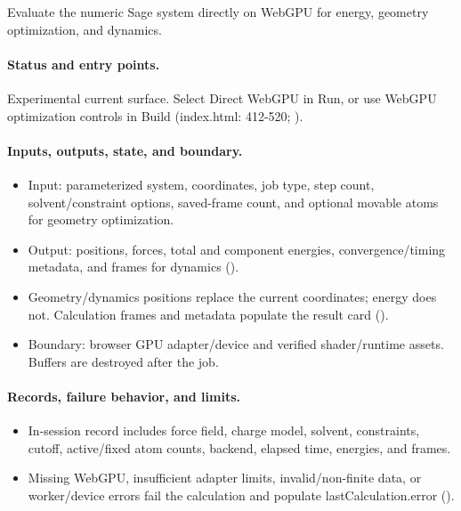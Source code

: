 \documentclass[11pt]{article}
\begin{document}
\begin{small}
Evaluate the numeric Sage system directly on WebGPU for energy, geometry optimization, and dynamics.

\paragraph{Status and entry points.}

Experimental current surface. Select Direct WebGPU in Run, or use WebGPU optimization controls in Build (index.html: 412-520; ).

\paragraph{Inputs, outputs, state, and boundary.}

\begin{itemize}[leftmargin=*]

\item Input: parameterized system, coordinates, job type, step count, solvent/constraint options, saved-frame count, and optional movable atoms for geometry optimization.

\item Output: positions, forces, total and component energies, convergence/timing metadata, and frames for dynamics ().

\item Geometry/dynamics positions replace the current coordinates; energy does not. Calculation frames and metadata populate the result card ().

\item Boundary: browser GPU adapter/device and verified shader/runtime assets. Buffers are destroyed after the job.

\end{itemize}

\paragraph{Records, failure behavior, and limits.}

\begin{itemize}[leftmargin=*]

\item In-session record includes force field, charge model, solvent, constraints, cutoff, active/fixed atom counts, backend, elapsed time, energies, and frames.

\item Missing WebGPU, insufficient adapter limits, invalid/non-finite data, or worker/device errors fail the calculation and populate lastCalculation.error ().


\end{itemize}
\end{small}
\end{document}
